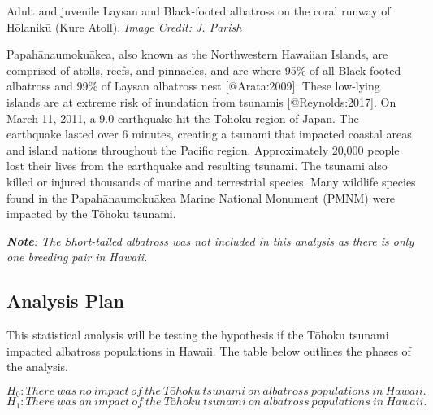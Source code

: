 \documentclass[
]{article}
\begin{document}
Adult and juvenile Laysan and Black-footed albatross on the coral runway
of Hōlanikū (Kure Atoll). \emph{Image Credit: J. Parish}

Papahānaumokuākea, also known as the Northwestern Hawaiian Islands, are
comprised of atolls, reefs, and pinnacles, and are where 95\% of all
Black-footed albatross and 99\% of Laysan albatross nest
{[}@Arata:2009{]}. These low-lying islands are at extreme risk of
inundation from tsunamis {[}@Reynolds:2017{]}. On March 11, 2011, a 9.0
earthquake hit the Tōhoku region of Japan. The earthquake lasted over 6
minutes, creating a tsunami that impacted coastal areas and island
nations throughout the Pacific region. Approximately 20,000 people lost
their lives from the earthquake and resulting tsunami. The tsunami also
killed or injured thousands of marine and terrestrial species. Many
wildlife species found in the Papahānaumokuākea Marine National Monument
(PMNM) were impacted by the Tōhoku tsunami.

\emph{\textbf{Note}: The Short-tailed albatross was not included in this
analysis as there is only one breeding pair in Hawaii.}

\hypertarget{analysis-plan}{%
\subsection{Analysis Plan}\label{analysis-plan}}

This statistical analysis will be testing the hypothesis if the Tōhoku
tsunami impacted albatross populations in Hawaii. The table below
outlines the phases of the analysis.

\[H_{0}: There\ was\ no\ impact\ of\ the\ Tōhoku\ tsunami\ on\ albatross\ populations\ in\ Hawaii.\]
\[H_{1}: There\ was\ an\ impact\ of\ the\ Tōhoku\ tsunami\ on\ albatross\ populations\ in\ Hawaii.\]
\end{document}
